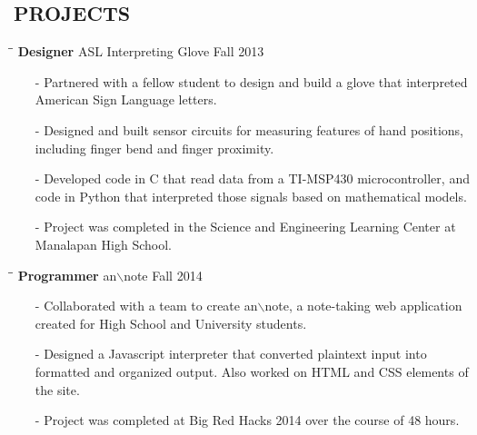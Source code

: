 \documentclass{res}
\begin{document}
\begin{resume}
    
\section{PROJECTS}    
	\vspace{-5pt}
	\begin{tabbing}
    \hspace{2.3in}\= \hspace{2.4in}\= \kill
    {\bf Designer} \>ASL Interpreting Glove \>Fall 2013\\
  \end{tabbing}\vspace{-15pt}
  \begin{itemize}[leftmargin=*, nolistsep]
    \item[-] Partnered with a fellow student to design and build a glove that interpreted American Sign Language letters.
    \item[-] Designed and built sensor circuits for measuring features of hand positions, including finger bend and finger proximity.
    \item[-] Developed code in C that read data from a TI-MSP430 microcontroller, and code in Python that interpreted those signals based on mathematical models.
    \item[-] Project was completed in the Science and Engineering Learning Center at Manalapan High School.
  \end{itemize}
  \vspace{-10pt}
  \begin{tabbing}
    \hspace{2.3in}\= \hspace{2.4in}\= \kill
    {\bf Programmer} \>an$\backslash$note \>Fall 2014\\
  \end{tabbing}\vspace{-15pt}
  \begin{itemize}[leftmargin=*, nolistsep]
    \item[-] Collaborated with a team to create an$\backslash$note, a note-taking web application created for High School and University students.
    \item[-] Designed a Javascript interpreter that converted plaintext input into formatted and organized output. Also worked on HTML and CSS elements of the site.
    \item[-] Project was completed at Big Red Hacks 2014 over the course of 48 hours.
  \end{itemize}
  \vspace{-10pt}

\end{resume}
\end{document}
